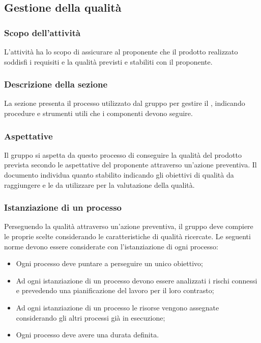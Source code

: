 \subsection{Gestione della qualità}
\subsubsection{Scopo dell'attività} 
L'attività ha lo scopo di assicurare al proponente che il prodotto realizzato soddisfi i requisiti e la qualità previsti e stabiliti con il proponente.
\subsubsection{Descrizione della sezione} 
La sezione presenta il processo utilizzato dal gruppo per gestire il , indicando procedure e strumenti utili che i componenti devono seguire.
\subsubsection{Aspettative}
Il gruppo si aspetta da questo processo di conseguire la qualità del prodotto prevista secondo le aspettative del proponente attraverso un'azione preventiva. Il documento \PdQ individua quanto stabilito indicando gli obiettivi di qualità da raggiungere e le  da utilizzare per la valutazione della qualità.
\subsubsection{Istanziazione di un processo}
Perseguendo la qualità attraverso un'azione preventiva, il gruppo deve compiere le proprie scelte considerando le caratteristiche di qualità ricercate. 
Le seguenti norme devono essere considerate con l'istanziazione di ogni processo:
\begin{itemize}
	\item Ogni processo deve puntare a perseguire un unico obiettivo;
	\item Ad ogni istanziazione di un processo devono essere analizzati i rischi connessi e prevedendo una pianificazione del lavoro per il loro contrasto;
	\item Ad ogni istanziazione di un processo le risorse vengono assegnate considerando gli altri processi già in esecuzione;
	\item Ogni processo deve avere una durata definita.
\end{itemize}
